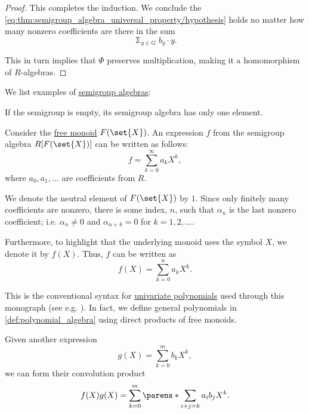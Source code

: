 \begin{proof}
  This completes the induction. We conclude the \eqref{eq:thm:semigroup_algebra_universal_property/hypothesis} holds no matter how many nonzero coefficients are there in the sum
  \begin{equation*}
    \Bbbsum_{y \in G} b_y \cdot y.
  \end{equation*}

  This in turn implies that \( \Phi \) preserves multiplication, making it a homomorphism of \( R \)-algebras.
\end{proof}

\begin{example}\label{ex:def:semigroup_algebra}
  We list examples of \hyperref[def:semigroup_algebra]{semigroup algebras}:
  \begin{thmenum}
     If the semigroup is empty, its semigroup algebra has only one element.

     Consider the \hyperref[def:free_monoid]{free monoid} \( F(\set{ X }) \). An expression \( f \) from the semigroup algebra \( R[F(\set{ X })] \) can be written as follows:
    \begin{equation*}
      f = \sum_{k=0}^\infty a_k X^k,
    \end{equation*}
    where \( a_0, a_1, \ldots \) are coefficients from \( R \).

    We denote the neutral element of \( F(\set{ X }) \) by \( 1 \). Since only finitely many coefficients are nonzero, there is some index, \( n \), such that \( \alpha_n \) is the last nonzero coefficient; i.e. \( \alpha_n \neq 0 \) and \( \alpha_{n+k} = 0 \) for \( k = 1, 2, \ldots \).

    Furthermore, to highlight that the underlying monoid uses the symbol \( X \), we denote it by \( f(X) \). Thus, \( f \) can be written as
    \begin{equation*}
      f(X) = \sum_{k=0}^n a_k X^k.
    \end{equation*}

    This is the conventional syntax for \hyperref[def:univariate_polynomial]{univariate polynomials} used through this monograph (see e.g. ). In fact, we define general polynomials in \cref{def:polynomial_algebra} using direct products of free monoids.

    Given another expression
    \begin{equation*}
      g(X) = \sum_{k=0}^m b_k X^k,
    \end{equation*}
    we can form their convolution product
    \begin{equation}\label{ex:def:semigroup_algebra/natural/convolution}
      f(X) g(X) = \sum_{k=0}^m \parens*{ \sum_{i+j=k} a_i b_j } X^k.
    \end{equation}


\end{thmenum}
\end{example}
